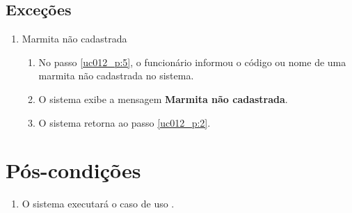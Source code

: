 \subsection{Exceções}

\begin{enumerate}[label=E\arabic*]
	\item Marmita não cadastrada \label{uc012_e:1}
	\begin{enumerate}[label*=.\arabic*]
		\item[] No passo \ref{uc012_p:5}, o funcionário informou o código ou nome de uma marmita não cadastrada no sistema.
		\item O sistema exibe a mensagem \textbf{Marmita não cadastrada}.
		\item O sistema retorna ao passo \ref{uc012_p:2}.
	\end{enumerate}
\end{enumerate}

\section{Pós-condições}

\begin{enumerate}
	\item O sistema executará o caso de uso .	
\end{enumerate}